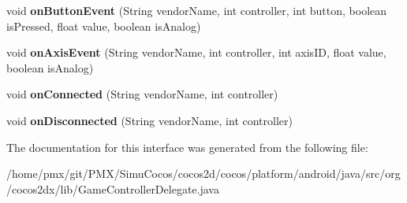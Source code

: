 \begin{DoxyCompactItemize}
void {\bfseries on\+Button\+Event} (String vendor\+Name, int controller, int button, boolean is\+Pressed, float value, boolean is\+Analog)
\item 
\mbox{\label{interfaceorg_1_1cocos2dx_1_1lib_1_1GameControllerDelegate_1_1ControllerEventListener_afe2ca5a24f2fe11963d47b818b8234a1}} 
void {\bfseries on\+Axis\+Event} (String vendor\+Name, int controller, int axis\+ID, float value, boolean is\+Analog)
\item 
\mbox{\label{interfaceorg_1_1cocos2dx_1_1lib_1_1GameControllerDelegate_1_1ControllerEventListener_ab2f6d0de13176da4840b1c3fbda536c0}} 
void {\bfseries on\+Connected} (String vendor\+Name, int controller)
\item 
\mbox{\label{interfaceorg_1_1cocos2dx_1_1lib_1_1GameControllerDelegate_1_1ControllerEventListener_a700eef85e297e5d9d7ab9c56c7af5dc1}} 
void {\bfseries on\+Disconnected} (String vendor\+Name, int controller)
\end{DoxyCompactItemize}


The documentation for this interface was generated from the following file\+:\begin{DoxyCompactItemize}
\item 
/home/pmx/git/\+P\+M\+X/\+Simu\+Cocos/cocos2d/cocos/platform/android/java/src/org/cocos2dx/lib/Game\+Controller\+Delegate.\+java\end{DoxyCompactItemize}
